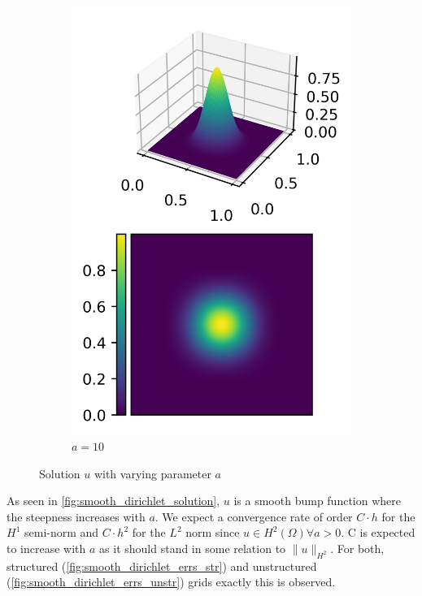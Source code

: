 \documentclass[11pt,a4paper]{article}
\begin{document}
\begin{multicols}{2}
\begin{figure}[H]
\begin{subfigure}{.5\linewidth}
    \includegraphics[width=.9\linewidth]{contour_10}
    \caption{$a = 10$}
  \end{subfigure}
  \caption{Solution $u$ with varying parameter $a$}
  \label{fig:smooth_dirichlet_solution}
\end{figure}

As seen in \autoref{fig:smooth_dirichlet_solution}, $u$ is a smooth bump
function where the steepness increases with $a$.
We expect a convergence rate of order $C\cdot h$ for the $H^1$ semi-norm
and $C\cdot h^2$ for the $L^2$ norm since $u \in H^2(\Omega) \forall a > 0$.
C is expected to increase with $a$ as it should stand in some relation to $\lVert u \rVert_{H^2}$.
For both, structured (\ref{fig:smooth_dirichlet_errs_str}) and unstructured (\ref{fig:smooth_dirichlet_errs_unstr})
grids exactly this is observed.


\end{multicols}
\end{document}
